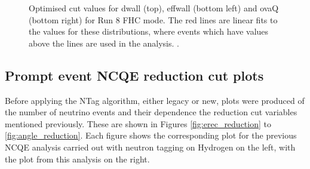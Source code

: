 \begin{figure}
\begin{minipage}{.5\linewidth}
    \end{minipage}\par\medskip
    \centering
    
    \caption{Optimised cut values for dwall (top), effwall (bottom left) and ovaQ (bottom right) for Run 8 FHC mode. The red lines are linear fits to the values for these distributions, where events which have values above the lines are used in the analysis. \cite{Abe_2019}.}
    \label{fig:optimised_dwall_effwall_ovaq}
\end{figure}
    


\subsection{Prompt event NCQE reduction cut plots}

Before applying the NTag algorithm, either legacy or new, plots were produced of the number of neutrino events and their dependence the reduction cut variables mentioned previously. These are shown in Figures \ref{fig:erec_reduction} to \ref{fig:angle_reduction}. Each figure shows the corresponding plot for the previous NCQE analysis carried out with neutron tagging on Hydrogen on the left, with the plot from this analysis on the right. 


